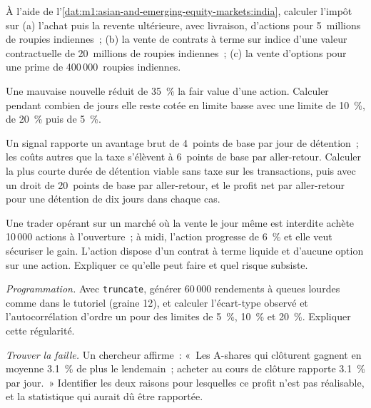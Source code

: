 \begin{exercise}[$\star$]\label{exo:m1:asian-and-emerging-equity-markets:3}
À l'aide de l'\cref{dat:m1:asian-and-emerging-equity-markets:india}, calculer l'impôt
sur (a) l'achat puis la revente ultérieure, avec livraison, d'actions pour 5~millions de roupies indiennes~; (b)
la vente de contrats à terme sur indice d'une valeur contractuelle de 20~millions de roupies indiennes~; (c) la vente
d'options pour une prime de 400\,000~roupies indiennes.
\end{exercise}

\begin{exercise}[$\star\star$]\label{exo:m1:asian-and-emerging-equity-markets:4}
Une mauvaise nouvelle réduit de 35~\% la fair value d'une action. Calculer pendant
combien de jours elle reste cotée en limite basse avec une limite de 10~\%, de 20~\% puis de 5~\%.
\end{exercise}

\begin{exercise}[$\star\star$]\label{exo:m1:asian-and-emerging-equity-markets:5}
Un signal rapporte un avantage brut de 4~points de base par jour de détention~; les coûts autres que
la taxe s'élèvent à 6~points de base par aller-retour.
Calculer la plus courte durée de détention viable sans taxe sur les transactions, puis avec un droit de 20~points de base par aller-retour, et
le profit net par aller-retour pour une détention de dix jours dans chaque cas.
\end{exercise}

\begin{exercise}[$\star\star$]\label{exo:m1:asian-and-emerging-equity-markets:6}
Une trader opérant sur un marché où la vente le jour même est interdite achète 10\,000 actions
à l'ouverture~; à midi, l'action progresse de 6~\% et elle veut sécuriser le gain.
L'action dispose d'un contrat à terme liquide et d'aucune option sur une action. Expliquer
ce qu'elle peut faire et quel risque subsiste.
\end{exercise}

\begin{exercise}[$\star\star\star$]\label{exo:m1:asian-and-emerging-equity-markets:7}
\emph{Programmation.} Avec \texttt{truncate}, générer 60\,000 rendements à queues lourdes
comme dans le tutoriel (graine 12), et calculer l'écart-type observé et
l'autocorrélation d'ordre un pour des limites de 5~\%, 10~\% et 20~\%. Expliquer cette régularité.
\end{exercise}

\begin{exercise}[$\star\star\star$]\label{exo:m1:asian-and-emerging-equity-markets:8}
\emph{Trouver la faille.} Un chercheur affirme~: «~Les A-shares qui clôturent 
gagnent en moyenne 3.1~\% de plus le lendemain~; acheter au cours de clôture 
rapporte 3.1~\% par jour.~» Identifier les deux raisons pour lesquelles ce profit n'est pas réalisable,
et la statistique qui aurait dû être rapportée.
\end{exercise}


